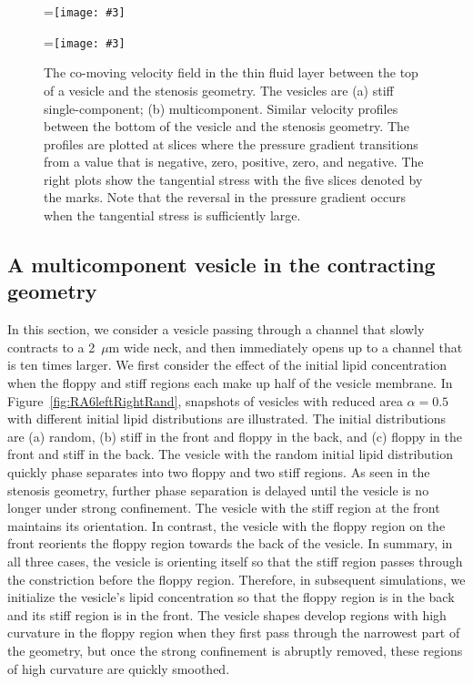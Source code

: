 \documentclass[twoside,twocolumn,9pt]{article}
\newcommand{\subfigimg}[3][,]{%
  \setbox1=\hbox{\texttt{[image: \#3]}}%
  \leavevmode\rlap{\usebox1}%
  \rlap{\hspace*{0pt}\raisebox{\dimexpr\ht1-0\baselineskip}{\bf
  \normalsize #2}}%
  \phantom{\usebox1}%
}
\begin{document}
\begin{figure}
  \centering
  \subfigimg[width=\columnwidth]{(a)}{figures/SC_top.pdf}
  \subfigimg[width=\columnwidth]{(b)}{figures/MCp5_top.pdf}
  \caption{\label{fig:BLvelocities} \small The co-moving velocity field
  in the thin fluid layer between the top of a vesicle and the stenosis
  geometry. The vesicles are (a) stiff single-component; (b)
  multicomponent. Similar velocity profiles between the bottom of the
  vesicle and the stenosis geometry. The profiles are plotted at slices
  where the pressure gradient transitions from a value that is negative,
  zero, positive, zero, and negative. The right plots show the
  tangential stress with the five slices denoted by the marks. Note that
  the reversal in the pressure gradient occurs when the tangential
  stress is sufficiently large.}
\end{figure}


\subsection{\label{subsec:Contraction} A multicomponent vesicle in the
contracting geometry}
In this section, we consider a vesicle passing through a channel that
slowly contracts to a  2~$\mu$m wide neck, and then
immediately opens up to a channel that is ten times larger. We
first consider the effect of the initial lipid concentration when the
floppy and stiff regions each make up half of the vesicle membrane. In
Figure~\ref{fig:RA6leftRightRand}, snapshots of vesicles with reduced
area $\alpha = 0.5$ with different initial lipid distributions are
illustrated. The initial distributions are (a) random, (b) stiff in the
front and floppy in the back, and (c) floppy in the front and stiff in
the back. The vesicle with the random initial lipid distribution quickly
phase separates into two floppy and two stiff regions. As seen in the
stenosis geometry, further phase separation is delayed until the vesicle
is no longer under strong confinement. The vesicle with the stiff region
at the front maintains its orientation. In contrast, the vesicle with
the floppy region on the front reorients the floppy region towards the
back of the vesicle. In summary, in all three cases, the vesicle is
orienting itself so that the stiff region passes through the
constriction before the floppy region. Therefore, in subsequent
simulations, we initialize the vesicle's lipid concentration so that the
floppy region is in the back and its stiff region is in the front. The
vesicle shapes develop regions with high curvature in the floppy region
when they first pass through the narrowest part of the geometry, but
once the strong confinement is abruptly removed, these regions of high
curvature are quickly smoothed.
\end{document}
